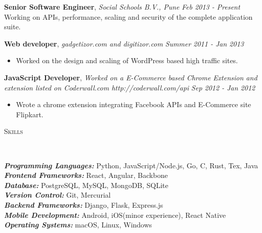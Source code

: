 \documentclass[9pt]{article}
\newenvironment{changemargin}[2]{%
  \begin{list}{}{%
    \setlength{\topsep}{0pt}%
    \setlength{\leftmargin}{#1}%
    \setlength{\rightmargin}{#2}%
    \setlength{\listparindent}{\parindent}%
    \setlength{\itemindent}{\parindent}%
    \setlength{\parsep}{\parskip}%
  }%
  \item[]}{\end{list}
}
\newcommand{\lineover}{
    \begin{changemargin}{-0.05in}{-0.05in}
        \vspace*{-8pt}
        \hrulefill \\
        \vspace*{-2pt}
    \end{changemargin}
}
\newcommand{\header}[1]{
    \begin{changemargin}{-0.5in}{-0.5in}
        \scshape{#1}\\
    \lineover
    \end{changemargin}
}
\newenvironment{body} {
    \vspace*{-16pt}
    \begin{changemargin}{-0.25in}{-0.5in}
  }
    {\end{changemargin}
}
\begin{document}
\begin{body}
    \vspace{14pt}
    \textbf{Senior Software Engineer}, \emph{Social Schools B.V., Pune} \hfill \emph{Feb 2013 - Present}\\
    Working on APIs, performance, scaling and security of the complete application suite.
    \vspace*{-4pt}

    \vspace{14pt}
    \textbf{Web developer}, \emph{gadgetizor.com and digitizor.com} \hfill \emph{Summer 2011 - Jan 2013}\\
    \vspace*{-4pt}
    \begin{itemize} \itemsep -0pt  %
        \item Worked on the design and scaling of WordPress based high traffic sites.
    \end{itemize}

    \textbf {JavaScript Developer}, \emph{Worked on a E-Commerce based Chrome Extension and extension listed on Coderwall.com http://coderwall.com/api} \hfill \emph{Sep 2012 - Jan 2012}\\
    \vspace*{-4pt}
    \begin{itemize} \itemsep -0pt
        \item Wrote a chrome extension integrating Facebook APIs and E-Commerce site Flipkart.
    \end{itemize}
\end{body}

\smallskip


\header{Skills}

\begin{body}
    \vspace{14pt}
    \emph{\textbf{Programming Languages:}}{} Python, JavaScript/Node.js, Go, C, Rust, Tex, Java\\
    \emph{\textbf{Frontend Frameworks:}}{} React, Angular, Backbone\\
    \emph{\textbf{Database:}}{} PostgreSQL, MySQL, MongoDB, SQLite\\
    \emph{\textbf{Version Control:}}{} Git, Mercurial\\
    \emph{\textbf{Backend Frameworks:}}{} Django, Flask, Express.js\\
    \emph{\textbf{Mobile Development:}}{} Android, iOS(minor experience), React Native\\
    \emph{\textbf{Operating Systems:}}{} macOS, Linux, Windows\\
\end{body}
\end{document}
